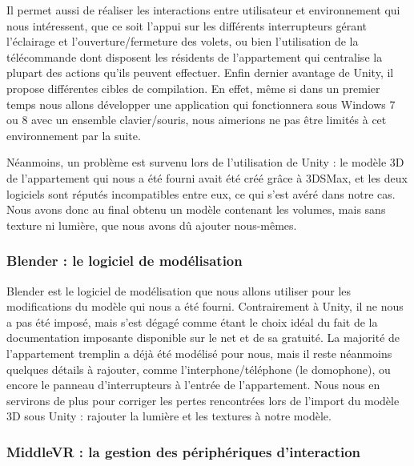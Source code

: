 Il permet aussi de réaliser les interactions entre utilisateur et environnement qui nous intéressent, que ce soit l'appui sur les différents interrupteurs gérant l'éclairage et l'ouverture/fermeture des volets, ou bien l'utilisation de la télécommande dont disposent les résidents de l'appartement qui centralise la plupart des actions qu'ils peuvent effectuer. 
Enfin dernier avantage de Unity, il propose différentes cibles de compilation. En effet, même si dans un premier temps nous allons développer une application qui fonctionnera sous Windows 7 ou 8 avec un ensemble clavier/souris, nous aimerions ne pas être limités à cet environnement par la suite. \newline

Néanmoins, un problème est survenu lors de l'utilisation de Unity : le modèle 3D de l'appartement qui nous a été fourni avait été créé grâce à 3DSMax, et les deux logiciels sont réputés incompatibles entre eux, ce qui s'est avéré dans notre cas. Nous avons donc au final obtenu un modèle contenant les volumes, mais sans texture ni lumière, que nous avons dû ajouter nous-mêmes. 

\subsubsection{Blender : le logiciel de modélisation}
Blender est le logiciel de modélisation que nous allons utiliser pour les modifications du modèle qui nous a été fourni. Contrairement à Unity, il ne nous a pas été imposé, mais s'est dégagé comme étant le choix idéal du fait de la documentation imposante disponible sur le net et de sa gratuité.\newline
La majorité de l'appartement tremplin a déjà été modélisé pour nous, mais il reste néanmoins quelques détails à rajouter, comme l'interphone/téléphone (le domophone), ou encore le panneau d'interrupteurs à l'entrée de l'appartement. Nous nous en servirons de plus pour corriger les pertes rencontrées lors de l'import du modèle 3D sous Unity : rajouter la lumière et les textures à notre modèle. 

\subsubsection{MiddleVR : la gestion des périphériques d'interaction}

